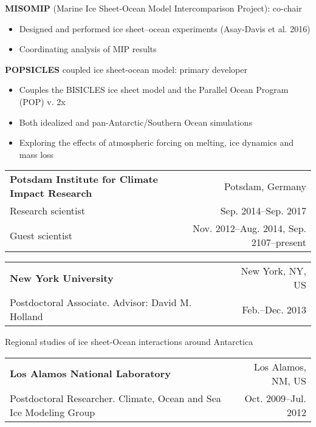 \documentclass[12pt,letterpaper]{article}
\begin{document}
\begin{flushleft}
\textbf{MISOMIP} (Marine Ice Sheet-Ocean Model Intercomparison Project): co-chair

\begin{itemize}[noitemsep,nolistsep]
  \item Designed and performed ice sheet--ocean experiments (Asay-Davis et al. 2016)
  \item Coordinating analysis of MIP results
\end{itemize}

\vspace{4pt}

\textbf{POPSICLES} coupled ice sheet-ocean model: primary developer

\begin{itemize}[noitemsep,nolistsep]
  \item Couples the BISICLES ice sheet model and the Parallel Ocean Program (POP) v. 2x
  \item Both idealized and pan-Antarctic/Southern Ocean simulations
  \item Exploring the effects of atmospheric forcing on melting, ice dynamics and mass loss
\end{itemize}

\vspace{10pt}

\begin{tabularx}{\textwidth}{@{} X r @{}}
{\bf Potsdam Institute for Climate Impact Research} &  Potsdam, Germany\\
Research scientist  &   Sep. 2014--Sep. 2017 \\
Guest scientist &   Nov. 2012--Aug. 2014, Sep. 2107--present
\end{tabularx}

\vspace{4pt}

\begin{tabularx}{\textwidth}{@{} X r@{} }
{\bf  New York University}  & New York, NY, US\\
Postdoctoral Associate. Advisor: David M. Holland &  Feb.--Dec. 2013
\end{tabularx}

\vspace{4pt}

Regional studies of ice sheet-Ocean interactions around Antarctica
\vspace{10pt}

\begin{tabularx}{\textwidth}{@{} X r@{} }
{\bf Los Alamos National Laboratory} & Los Alamos, NM, US \\
Postdoctoral Researcher. Climate, Ocean and Sea Ice Modeling Group & Oct. 2009--Jul. 2012
\end{tabularx}


\end{flushleft}
\end{document}

